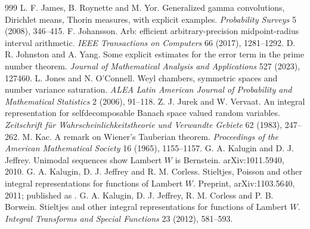 \begin{thebibliography}{999}
 L. F. James, B. Roynette and M. Yor. Generalized gamma convolutions, Dirichlet means, Thorin measures, with explicit examples. \emph{Probability Surveys} 5 (2008), 346--415.
 F. Johansson. Arb: efficient arbitrary-precision midpoint-radius interval arithmetic. \emph{IEEE Transactions on Computers} 66 (2017), 1281--1292.
 D. R. Johnston and A. Yang. Some explicit estimates for the error term in the prime number theorem. \emph{Journal of Mathematical Analysis and Applications} 527 (2023), 127460.
 L. Jones and N. O'Connell. Weyl chambers, symmetric spaces and number variance saturation. \emph{ALEA Latin American Journal of Probability and Mathematical Statistics} 2 (2006), 91--118.
 Z. J. Jurek and W. Vervaat. An integral representation for selfdecomposable Banach space valued random variables. \emph{Zeitschrift f\"ur Wahrscheinlichkeitstheorie und Verwandte Gebiete} 62 (1983), 247--262.
 M. Kac. A remark on Wiener's Tauberian theorem. \emph{Proceedings of the American Mathematical Society} 16 (1965), 1155--1157.
 G. A. Kalugin and D. J. Jeffrey. Unimodal sequences show Lambert $W$ is Bernstein. arXiv:1011.5940, 2010.
 G. A. Kalugin, D. J. Jeffrey and R. M. Corless. Stieltjes, Poisson and other integral representations for functions of Lambert $W$. Preprint, arXiv:1103.5640, 2011; published as \cite{KJCB12,KJC12}.
 G. A. Kalugin, D. J. Jeffrey, R. M. Corless and P. B. Borwein. Stieltjes and other integral representations for functions of Lambert $W$. \emph{Integral Transforms and Special Functions} 23 (2012), 581--593.

\end{thebibliography}
